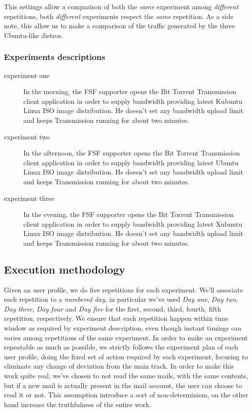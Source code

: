 \documentclass[10pt,a4paper]{article}
\begin{document}
    This settings allow a comparison of both the \emph{same}
    experiment among \emph{different} repetitions, both
    \emph{different} experiments respect the \emph{same} repetition.
    As a side note, this allow us to make a comparison of the traffic
    generated by the three Ubuntu-like distros.

    \subsubsection*{Experiments descriptions}
    
    \begin{description}
    \item[experiment one] In the morning, the FSF supporter opens the
      Bit Torrent Transmission client application in order to supply
      bandwidth providing latest Kubuntu Linux ISO image
      distribution. He doesn't set any bandwidth upload limit and
      keeps Transmission running for about two minutes.
    \item[experiment two] In the afternoon, the FSF supporter opens
      the Bit Torrent Transmission client application in order to
      supply bandwidth providing latest Ubuntu Linux ISO image
      distribution. He doesn't set any bandwidth upload limit and
      keeps Transmission running for about two minutes.
    \item[experiment three] In the evening, the FSF supporter opens
      the Bit Torrent Transmission client application in order to
      supply bandwidth providing latest Xubuntu Linux ISO image
      distribution. He doesn't set any bandwidth upload limit and
      keeps Transmission running for about two minutes.
    \end{description}

    \subsection{Execution methodology}

    Given an user profile, we do five repetitions for each
    experiment. We'll associate each repetition to a \emph{numbered
      day}, in particular we've used \emph{Day one}, \emph{Day two},
    \emph{Day three}, \emph{Day four} and \emph{Day five} for the
    first, second, third, fourth, fifth repetition, respectively. We
    ensure that each repetition happen within time window as required
    by experiment description, even though instant timings can varies
    among repetitions of the same experiment. In order to make an
    experiment repeatable as much as possible, we strictly follows the
    experiment plan of each user profile, doing the fixed set of
    action required by each experiment, focusing to eliminate any
    change of deviation from the main track. In order to make this
    work quite real, we've chosen to not read the same mails, with the
    same contents, but if a new mail is actually present in the mail
    account, the user can choose to read it or not. This assumption
    introduce a sort of non-determinism, on the other hand increase
    the truthfulness of the entire work.
\end{document}

